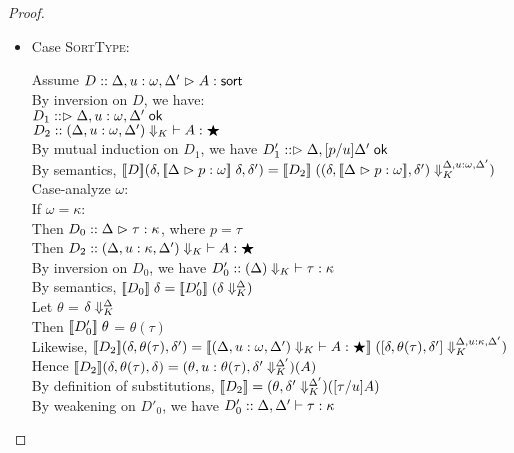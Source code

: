 \begin{proof}
\begin{enumerate}
\begin{itemize}
    \item Case \textsc{SortType}: 
      \begin{tabbedproof}
        \oo Assume $D :: \judgeSort[{\Delta, u:\omega, \Delta'}]{A}$ \\
        \ooo By inversion on $D$, we have: \\
        \oooo $D_1 :: \judgeACtx{\Delta, u:\omega, \Delta'}$ \\
        \oooo $D_2 :: \judgeWK[\restrictkind{\Delta, u:\omega, \Delta'}]{A}{\bigstar}$ \\
        \ooo By mutual induction on $D_1$, we have $D'_1 :: \judgeACtx{\Delta, [p/u]\Delta'}$ \\
        \ooo By semantics, 
             $\interp{D}(\delta, \interp{\judgeA{p}{\omega}}\;\delta, \delta') = 
              \interp{D_2}\;(\restricttyenv{\Delta, u:\omega, \Delta'}
             {(\delta, \interp{\judgeA{p}{\omega}}, \delta')})$ \\
        \ooo Case-analyze $\omega$:\\
        \oooo If $\omega = \kappa$:\\
        \ooooo Then $D_0 :: \judgeA{\tau}{\kappa}$, where $p = \tau$ \\
        \ooooo Then  $D_2 :: \judgeWK[\restrictkind{\Delta, u:\kappa, \Delta'}]{A}{\bigstar}$ \\
        \ooooo By inversion on $D_0$, we have $D'_0 :: \judgeWK[\restrictkind{\Delta}]{\tau}{\kappa}$ \\
        \ooooo By semantics, $\interp{D_0}\;\delta = \interp{D'_0}\;(\restricttyenv{\Delta}{\delta})$\\
        \ooooo Let $\theta$ = $\restricttyenv{\Delta}{\delta}$ \\
        \ooooo Then $\interp{D'_0}\;\theta$ = $\theta(\tau)$ \\ 
        \ooooo Likewise, $\interp{D_2}(\delta,\theta(\tau), \delta') = \interp{\judgeWK[\restrictkind{\Delta,u:\omega,\Delta'}]{A}{\bigstar}}\;(\restricttyenv{\Delta,u:\kappa,\Delta'}{[\delta, \theta(\tau), \delta']})$ \\
        \ooooo Hence $\interp{D_2}(\delta,\theta(\tau),\delta) = (\theta, u:\theta(\tau), \restricttyenv{\Delta'}{\delta'})(A)$\\
        \ooooo By definition of substitutions, 
                 $\interp{D_2} = (\theta, \restricttyenv{\Delta'}{\delta'})([\tau/u]A)$\\
        \ooooo By weakening on $D'_0$, we have $D'_0 :: \judgeWK[\Delta, \Delta']{\tau}{\kappa}$\\

\end{tabbedproof}
\end{itemize}
\end{enumerate}
\end{proof}
